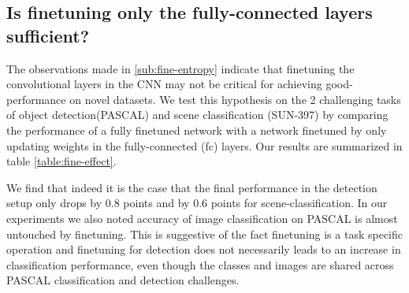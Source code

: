 \documentclass[runningheads]{llncs}
\begin{document}
\subsection{Is finetuning only the fully-connected layers sufficient?}
\label{sub:fine-fc-only}
The observations made in \ref{sub:fine-entropy} indicate that finetuning the convolutional layers in the CNN may not be critical for achieving good-performance on novel datasets. We test this hypothesis on the 2 challenging tasks of object detection(PASCAL) and scene classification (SUN-397) by comparing the performance of a fully finetuned network with a network finetuned by only updating weights in the fully-connected (fc) layers. Our results are summarized in table \ref{table:fine-effect}.

\setlength{\tabcolsep}{2pt}
\begin{table}[t!]
\begin{center}
\caption{Comparison in performance on of Alex-Net, Finetuned Network(ft-net) and a network with only fc layers finetuned (fc-ft).}
\label{table:fine-effect}
\end{center}
\end{table}
\setlength{\tabcolsep}{1.4pt}

We find that indeed it is the case that the final performance in the detection setup only drops by 0.8 points and by 0.6 points for scene-classification. In our experiments we also noted accuracy of image classification on PASCAL is almost untouched by finetuning. This is suggestive of the fact finetuning is a task specific operation and finetuning for detection does not necessarily leads to an increase in classification performance, even though the classes and images are shared across PASCAL classification and detection challenges. 
\end{document}
